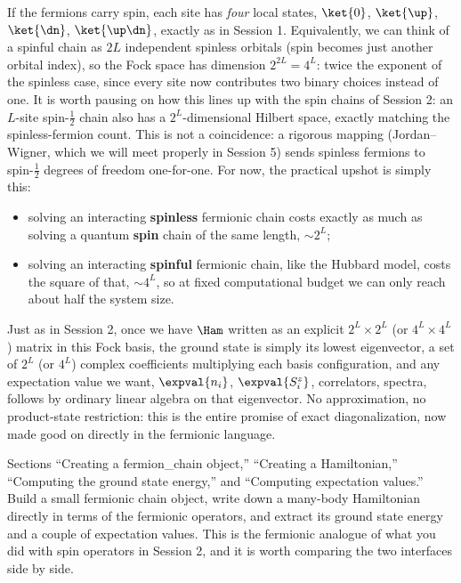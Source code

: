 \documentclass[all_sessions.tex]{subfiles}
\begin{document}
If the fermions carry spin, each site has \emph{four} local states, $\ket{0}$, $\ket{\up}$,
$\ket{\dn}$, $\ket{\up\dn}$, exactly as in Session 1. Equivalently, we can think of a spinful chain
as $2L$ independent spinless orbitals (spin becomes just another orbital index), so the Fock space
has dimension $2^{2L} = 4^L$: twice the exponent of the spinless case, since every site now
contributes two binary choices instead of one. It is worth pausing on how this lines up with the
spin chains of Session 2: an $L$-site spin-$\tfrac12$ chain also has a $2^L$-dimensional Hilbert
space, exactly matching the spinless-fermion count. This is not a coincidence: a rigorous mapping
(Jordan--Wigner, which we will meet properly in Session 5) sends spinless fermions to spin-$\tfrac12$
degrees of freedom one-for-one. For now, the practical upshot is simply this:
\begin{itemize}[nosep]
  \item solving an interacting \textbf{spinless} fermionic chain costs exactly as much as
    solving a quantum \textbf{spin} chain of the same length, $\sim 2^L$;
  \item solving an interacting \textbf{spinful} fermionic chain, like the Hubbard model, costs the
    square of that, $\sim 4^L$, so at fixed computational budget we can only reach about half the
    system size.
\end{itemize}
Just as in Session 2, once we have $\Ham$ written as an explicit $2^L\times2^L$ (or $4^L\times4^L$)
matrix in this Fock basis, the ground state is simply its lowest eigenvector, a set of $2^L$ (or
$4^L$) complex coefficients multiplying each basis configuration, and any expectation value we
want, $\expval{n_i}$, $\expval{S_i^z}$, correlators, spectra, follows by ordinary linear algebra on
that eigenvector. No approximation, no product-state restriction: this is the entire promise of
exact diagonalization, now made good on directly in the fermionic language.

\begin{notebook}
Sections ``Creating a fermion\_chain object,'' ``Creating a Hamiltonian,'' ``Computing the ground
state energy,'' and ``Computing expectation values.'' Build a small fermionic chain object, write
down a many-body Hamiltonian directly in terms of the fermionic operators, and extract its ground
state energy and a couple of expectation values. This is the fermionic analogue of what you did
with spin operators in Session 2, and it is worth comparing the two interfaces side by side.
\end{notebook}
\end{document}
